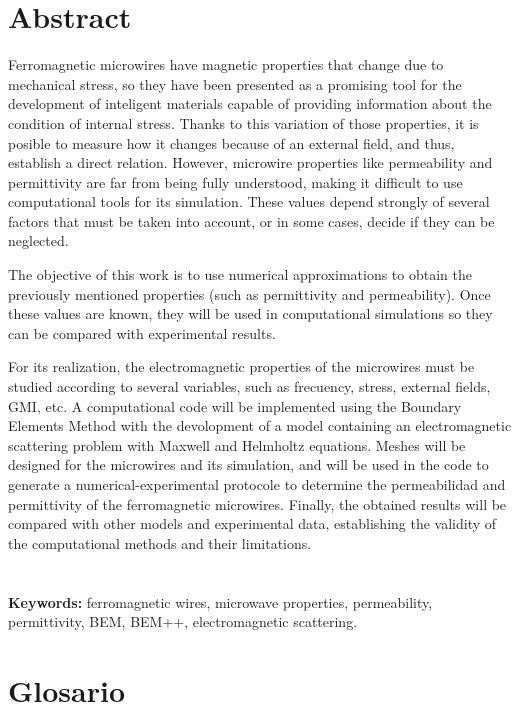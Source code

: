 \documentclass[12pt,letterpaper]{article}
\numberwithin{equation}{section}
\begin{document}
\pagebreak
\section*{Abstract}

Ferromagnetic microwires have magnetic properties that change due to mechanical stress, so they have been presented as a promising tool for the development of inteligent materials capable of providing information about the condition of internal stress. Thanks to this variation of those properties, it is posible to measure how it changes because of an external field, and thus, establish a direct relation. However, microwire properties like permeability and permittivity are far from being fully understood, making it difficult to use computational tools for its simulation. These values depend strongly of several factors that must be taken into account, or in some cases, decide if they can be neglected.

The objective of this work is to use numerical approximations to obtain the previously mentioned properties (such as permittivity and permeability). Once these values are known, they will be used in computational simulations so they can be compared with experimental results. 

For its realization, the electromagnetic properties of the microwires must be studied according to several variables, such as frecuency, stress, external fields, GMI, etc. A computational code will be implemented using the Boundary Elements Method with the devolopment of a model containing an electromagnetic scattering problem with Maxwell and Helmholtz equations. Meshes will be designed for the microwires and its simulation, and will be used in the code to generate a numerical-experimental protocole to determine the permeabilidad and permittivity of the ferromagnetic microwires. Finally, the obtained results will be compared with other models and experimental data, 	establishing the validity of the computational methods and their limitations.
 \\
 \\
 \\

\noindent \textbf{Keywords:} ferromagnetic wires, microwave properties, permeability, permittivity, BEM, BEM++, electromagnetic scattering.


\pagebreak
\section*{Glosario}
\end{document}
